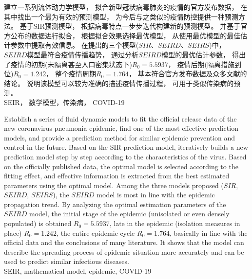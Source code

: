 \begin{cnabstract}
	\songti {}
	建立一系列流体动力学模型，
	拟合新型冠状病毒肺炎的疫情的官方发布数据，
	在其中找出一个最为有效的预测模型，
	为今后与之类似的疫情防控提供一种预测方法。
	基于SIR预测模型，
	根据病毒特点一步步迭代构建新的预测模型。
	并基于官方公布的数据进行拟合，
	根据拟合效果选择最优模型，
	从使用最优模型的最佳估计参数中提取有效信息。
	在提出的三个模型($SIR$、$SEIRD$、$SEIRS$)中，
	$SEIRD$模型最符合疫情传播趋势，
	通过分析$SEIRD$模型的最优估计参数，
	得出了疫情的初期(未隔离甚至人口密集状态下)$R_0=5.5937$，
	疫情后期(隔离措施到位)$R_0=1.242$，
	整个疫情周期$R_0=1.764$，
	基本符合官方发布数据及众多文献的结论。
	说明该模型可以较为准确的描述疫情传播过程，
	可用于类似传染病的预测。
	\\
	 SEIR， 数学模型，传染病， COVID-19
\end{cnabstract}
\begin{enabstract}
	Establish a series of fluid dynamic models to fit the official release data of the new coronavirus pneumonia epidemic,
	find one of the most effective prediction models,
	and provide a prediction method for similar epidemic prevention and control in the future.
	Based on the SIR prediction model,
	iteratively builds a new prediction model step by step according to the characteristics of the virus.
	Based on the officially published data,
	the optimal model is selected according to the fitting effect,
	and effective information is extracted from the best estimated parameters using the optimal model.
	Among the three models proposed ($SIR$, $SEIRD$, $SEIRS$),
	the $SEIRD$ model is most in line with the epidemic propagation trend.
	By analyzing the optimal estimation parameters of the $SEIRD$ model,
	the initial stage of the epidemic (unisolated or even densely populated) is obtained $R_0 = 5.5937$,
	late in the epidemic (isolation measures in place) $R_0 = 1.242$,
	the entire epidemic cycle $R_0 = 1.764$,
	basically in line with the official data and the conclusions of many literature.
	It shows that the model can describe the spreading process of epidemic situation more accurately and can be used to predict similar infectious diseases.
	\\
	 SEIR, mathematical model, epidemic, COVID-19
\end{enabstract}